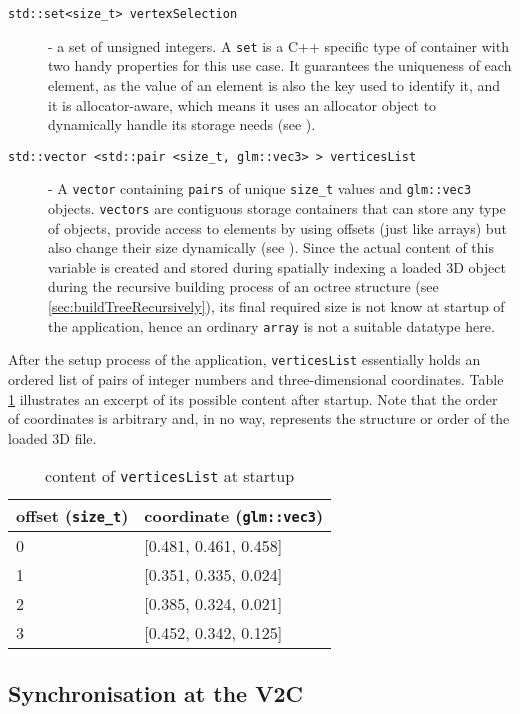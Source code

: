 \begin{description}
	\item[\texttt{std::set<size\_t> vertexSelection}] - a set of unsigned integers. A \texttt{set} is a C++ specific type of container with two handy properties for this use case. It guarantees the uniqueness of each element, as the value of an element is also the key used to identify it, and it is allocator-aware, which means it uses an allocator object to dynamically handle its storage needs (see \cite{set}).
	\item[\texttt{std::vector <std::pair <size\_t, glm::vec3> >  verticesList}] - A \texttt{vector} containing \texttt{pairs} of unique \texttt{size\_t} values and \texttt{glm::vec3} objects. \texttt{vectors} are contiguous storage containers that can store any type of objects, provide access to elements by using offsets (just like arrays) but also change their size dynamically (see \cite{vector}). Since the actual content of this variable is created and stored during spatially indexing a loaded 3D object during the recursive building process of an octree structure (see \ref{sec:buildTreeRecursively}), its final required size is not know at startup of the application, hence an ordinary \texttt{array} is not a suitable datatype here.
\end{description}

After the setup process of the application, \texttt{verticesList} essentially holds an ordered list of pairs of integer numbers and three-dimensional coordinates. Table \ref{tab:verticesList-startup} illustrates an excerpt of its possible content after startup. Note that the order of coordinates is arbitrary and, in no way, represents the structure or order of the loaded 3D file.

\begin{table}[]
\centering
	\begin{tabular}{l|l}
	offset (\texttt{size\_t}) & coordinate (\texttt{glm::vec3}) \\ \hline
	0 & [0.481, 0.461, 0.458] \\
	1 & [0.351, 0.335, 0.024] \\
	2 & [0.385, 0.324, 0.021] \\
	3 & [0.452, 0.342, 0.125]
	\end{tabular}
	\caption{content of \texttt{verticesList} at startup}
	\label{tab:verticesList-startup}
\end{table}

\subsection{Synchronisation at the V2C}
\label{synchronisation_at_the_v2c}

